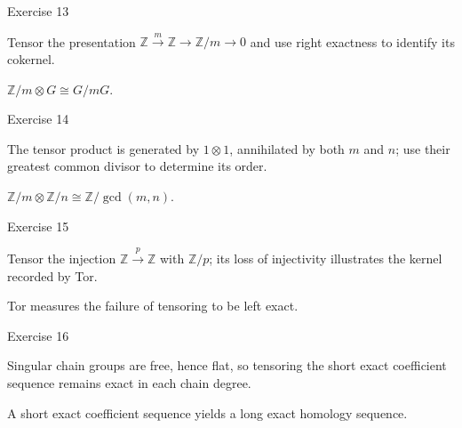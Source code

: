 \begin{exercise}\label{exr:viii25-13}
Exercise 13
\end{exercise}
\begin{hint}
Tensor the presentation \(\mathbb Z\xrightarrow{m}\mathbb Z\to\mathbb Z/m\to0\) and use right exactness to identify its cokernel.
\end{hint}
\begin{solution}
\(\mathbb Z/m\otimes G\cong G/mG\).
\end{solution}

\begin{exercise}\label{exr:viii25-14}
Exercise 14
\end{exercise}
\begin{hint}
The tensor product is generated by \(1\otimes1\), annihilated by both \(m\) and \(n\); use their greatest common divisor to determine its order.
\end{hint}
\begin{solution}
\(\mathbb Z/m\otimes\mathbb Z/n\cong\mathbb Z/\gcd(m,n)\).
\end{solution}

\begin{exercise}\label{exr:viii25-15}
Exercise 15
\end{exercise}
\begin{hint}
Tensor the injection \(\mathbb Z\xrightarrow{p}\mathbb Z\) with \(\mathbb Z/p\); its loss of injectivity illustrates the kernel recorded by Tor.
\end{hint}
\begin{solution}
Tor measures the failure of tensoring to be left exact.
\end{solution}

\begin{exercise}\label{exr:viii25-16}
Exercise 16
\end{exercise}
\begin{hint}
Singular chain groups are free, hence flat, so tensoring the short exact coefficient sequence remains exact in each chain degree.
\end{hint}
\begin{solution}
A short exact coefficient sequence yields a long exact homology sequence.
\end{solution}

